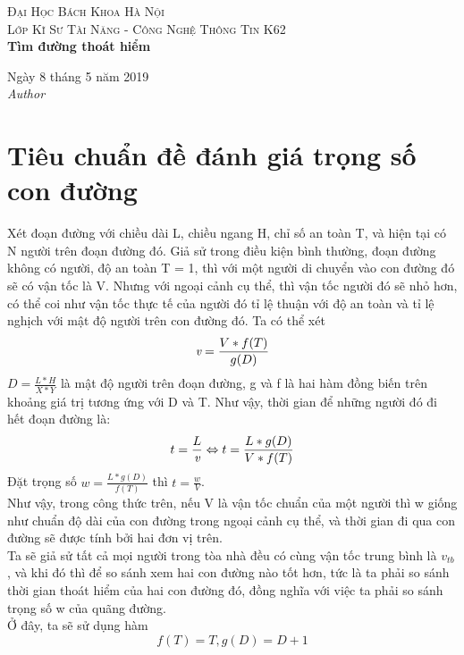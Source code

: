\documentclass{article}
\begin{document}
\textsc{\LARGE Đại Học Bách Khoa Hà Nội} \\[1,5cm]
\textsc{\large Lớp Kĩ Sư Tài Năng - Công Nghệ Thông Tin K62} \\[0.5cm]
{\huge\bfseries Tìm đường thoát hiểm }\\[0.4cm] 

    \begin{flushleft}
        \large
        Ngày 8 tháng 5 năm 2019 \\[0.5cm]
        \textit{Author}\\[0,3cm]
           
    \end{flushleft}
    
    \section{Tiêu chuẩn đề đánh giá trọng số con đường}
    Xét đoạn đường với chiều dài L, chiều ngang H, chỉ số an toàn T,
    và hiện tại có N người trên đoạn đường đó. Giả sử trong điều 
    kiện bình thường, đoạn đường không có người, độ an toàn T = 1, 
    thì với một người di chuyển vào con đường đó sẽ có vận tốc là V.
    Nhưng với ngoại cảnh cụ thể, thì vận tốc người đó sẽ nhỏ hơn,
    có thể coi như vận tốc thực tế của người đó tỉ lệ thuận với độ 
    an toàn và tỉ lệ nghịch với mật độ người trên con đường đó.
    Ta có thể xét 
    \begin{equation*}
        \emph{v} = \frac{V*f(T)}{g(D)}
    \end{equation*}
    $D = \frac{L*H}{X*Y}$ là mật độ người trên đoạn đường,
    g và f là hai hàm đồng biến trên khoảng giá trị tương ứng
    với D và T.
    Như vậy, thời gian để những người đó đi hết đoạn đường là:
    \begin{displaymath}
        t = \frac{L}{\emph{v}}  
        \Leftrightarrow t = \frac{L*g(D)}{V*f(T)}   
    \end{displaymath}
    Đặt trọng số $w = \frac{L*g(D)}{f(T)}$ thì $t = \frac{w}{V}$. \\
    Như vậy, trong công thức trên, nếu V là vận tốc chuẩn của một 
    người thì w giống như chuẩn độ dài của con đường trong ngoại 
    cảnh cụ thể, và thời gian đi qua con đường sẽ được tính bởi 
    hai đơn vị trên. \\
    Ta sẽ giả sử tất cả mọi người trong tòa nhà đều có cùng vận tốc
    trung bình là $v_{tb}$, và khi đó thì để so sánh xem hai con
    đường nào tốt hơn, tức là ta phải so sánh thời gian thoát hiểm 
    của hai con đường đó, đồng nghĩa với việc ta phải so sánh trọng 
    số w của quãng đường. \\ 
    Ở đây, ta sẽ sử dụng hàm 
    \begin{equation}
        f(T) = T, g(D) = D + 1
    \end{equation}
    
\end{document}
